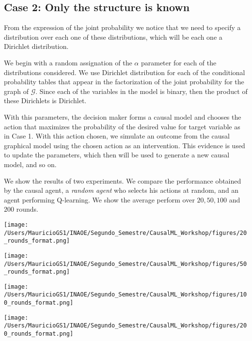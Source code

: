 \documentclass[11pt]{article}
\theoremstyle{plain}
\begin{document}
\subsection{Case 2: Only the structure is known}
From the expression of the joint probability we notice that we need to specify a distribution over each one of these distributions, which will be each one a Dirichlet distribution.

We begin with a random assignation of the $\alpha$ parameter for each of the distributions considered. We use Dirichlet distribution for each of the conditional probability tables that appear in the factorization of the joint probability for the graph of $\mathcal{G}$. Since each of the variables in the model is binary, then the product of these Dirichlets is Dirichlet.

With this parameters, the decision maker forms a causal model and chooses the action that maximizes the probability of the desired value for target variable as in Case 1.  With this action chosen, we simulate an outcome from the causal graphical model using the chosen action as an intervention. This evidence is used to update the parameters, which then will be used to generate a new causal model, and so on.

We show the results of two experiments. We compare the performance obtained by the causal agent, a \textit{random agent} who selects his actions at random, and an agent performing Q-learning. We show the average perform over $20, 50, 100$ and $200$ rounds.


\begin{center}
\begin{minipage}{0.48\linewidth}
\texttt{[image: /Users/MauricioGS1/INAOE/Segundo\_Semestre/CausalML\_Workshop/figures/20\_rounds\_format.png]}
\end{minipage}%
\hfill
\begin{minipage}{0.49\linewidth}
\texttt{[image: /Users/MauricioGS1/INAOE/Segundo\_Semestre/CausalML\_Workshop/figures/50\_rounds\_format.png]}
\end{minipage}
\end{center}
\begin{center}
\begin{minipage}{0.49\linewidth}
\texttt{[image: /Users/MauricioGS1/INAOE/Segundo\_Semestre/CausalML\_Workshop/figures/100\_rounds\_format.png]}
\end{minipage}
\hfill
\begin{minipage}{0.49\linewidth}
\texttt{[image: /Users/MauricioGS1/INAOE/Segundo\_Semestre/CausalML\_Workshop/figures/200\_rounds\_format.png]}
\end{minipage}
\end{center}
\end{document}
